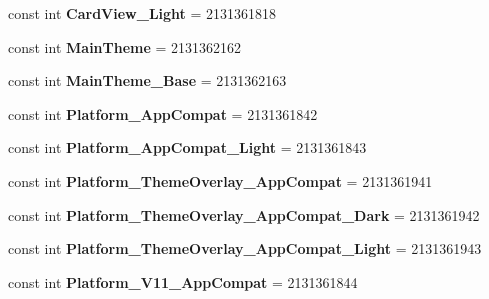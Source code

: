 \begin{DoxyCompactItemize}
const int {\bfseries Card\+View\+\_\+\+Light} = 2131361818
\item 
\mbox{\label{class_pinned_app_1_1_droid_1_1_resource_1_1_style_a1260b801d6dd338b99b92b7983f62028}} 
const int {\bfseries Main\+Theme} = 2131362162
\item 
\mbox{\label{class_pinned_app_1_1_droid_1_1_resource_1_1_style_ac9d5e2e4aa50aa03092421dd851f64eb}} 
const int {\bfseries Main\+Theme\+\_\+\+Base} = 2131362163
\item 
\mbox{\label{class_pinned_app_1_1_droid_1_1_resource_1_1_style_a8584510f452396a91446feff20e2fffb}} 
const int {\bfseries Platform\+\_\+\+App\+Compat} = 2131361842
\item 
\mbox{\label{class_pinned_app_1_1_droid_1_1_resource_1_1_style_a2d7f566b9b7e1fad1a91cf9d5bb89a2e}} 
const int {\bfseries Platform\+\_\+\+App\+Compat\+\_\+\+Light} = 2131361843
\item 
\mbox{\label{class_pinned_app_1_1_droid_1_1_resource_1_1_style_ac4b5400aea406edce9cb91d63c8b5385}} 
const int {\bfseries Platform\+\_\+\+Theme\+Overlay\+\_\+\+App\+Compat} = 2131361941
\item 
\mbox{\label{class_pinned_app_1_1_droid_1_1_resource_1_1_style_aa0224aa610f8f0213a0689876272f97d}} 
const int {\bfseries Platform\+\_\+\+Theme\+Overlay\+\_\+\+App\+Compat\+\_\+\+Dark} = 2131361942
\item 
\mbox{\label{class_pinned_app_1_1_droid_1_1_resource_1_1_style_a82373f8b555dfef6c6502dec88c79b95}} 
const int {\bfseries Platform\+\_\+\+Theme\+Overlay\+\_\+\+App\+Compat\+\_\+\+Light} = 2131361943
\item 
\mbox{\label{class_pinned_app_1_1_droid_1_1_resource_1_1_style_af99f7d9cf768ac1ef0b34f4572d98e94}} 
const int {\bfseries Platform\+\_\+\+V11\+\_\+\+App\+Compat} = 2131361844

\end{DoxyCompactItemize}
